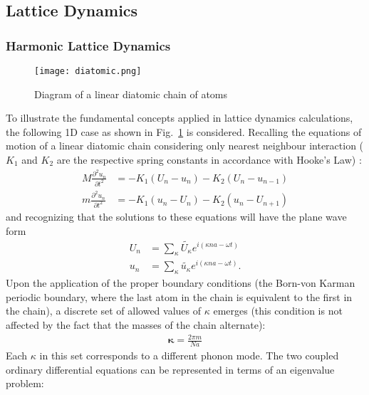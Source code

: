 \subsection{Lattice Dynamics}
\subsubsection{Harmonic Lattice Dynamics}\label{SEC:HLD}
\begin{figure}%
\centering
\texttt{[image: diatomic.png]}
\caption{Diagram of a linear diatomic chain of atoms}
\label{FIG:diatomic}
\end{figure}
To illustrate the fundamental concepts applied in lattice dynamics calculations, the following 1D case as shown in Fig.~\ref{FIG:diatomic} is considered. Recalling the equations of motion of a linear diatomic chain considering only nearest neighbour interaction ($K_1$ and $K_2$ are the respective spring constants in accordance with Hooke's Law) \cite{dove_introduction_1993-3}:
%
\begin{align}
	M\frac{\partial ^2 u_n}{\partial t^2}&=-K_1(U_n-u_n)-K_2(U_n-u_{n-1})\\
	m\frac{\partial ^2 u_n}{\partial t^2}&=-K_1(u_n-U_n)-K_2(u_n-U_{n+1})
\end{align}
%
and recognizing that the solutions to these equations will have the plane wave form
%
\begin{align}
	U_n&=\sum_\kappa \tilde{U_\kappa}e^{i(\kappa na-\omega t)}\\
	u_n&=\sum_\kappa \tilde{u_\kappa}e^{i(\kappa na-\omega t)}.
\end{align}
%
Upon the application of the proper boundary conditions (the Born-von Karman periodic boundary, where the last atom in the chain is equivalent to the first in the chain), a discrete set of allowed values of $\kappa$ emerges (this condition is not affected by the fact that the masses of the chain alternate):
%
\begin{align}
	\pmb{\kappa}=\frac{2\pi m}{Na}
\end{align}
%
Each $\kappa$ in this set corresponds to a different phonon mode. The two coupled ordinary differential equations can be represented in terms of an eigenvalue problem:
%
